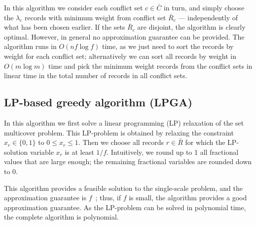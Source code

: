 In this algorithm we consider each conflict set $c \in \bar{C}$ in turn, and simply choose the $\lambda_c$ records with minimum weight from conflict set $\bar{R}_c$ --- independently of what has been chosen earlier. If the sets $\bar{R}_c$ are disjoint, the algorithm is clearly optimal. However, in general no approximation guarantee can be provided. The algorithm runs in $O(n f \log f)$ time, as we just need to sort the records by weight for each conflict set; alternatively we can sort all records by weight in $O(m \log m)$ time and pick the minimum weight records from the conflict sets in linear time in the total number of records in all conflict sets.


\subsection{LP-based greedy algorithm (LPGA)}
\label{sec:algorithms:lpga}

In this algorithm we first solve a linear programming (LP) relaxation of the set multicover problem. This LP-problem is obtained by relaxing the constraint $x_r \in \{0, 1\}$ to $0 \leq x_r \leq 1$. Then we choose all records $r \in \bar{R}$ for which the LP-solution variable $x_r$ is at least $1 / f$. Intuitively, we round up to 1 all fractional values that are large enough; the remaining fractional variables are rounded down to 0. 

This algorithm provides a feasible solution to the single-scale problem, and the approximation guarantee is $f$~\cite{vazirani2001approximation}; thus, if $f$ is small, the algorithm provides a good approximation guarantee. As the LP-problem can be solved in polynomial time, the complete algorithm is polynomial.




